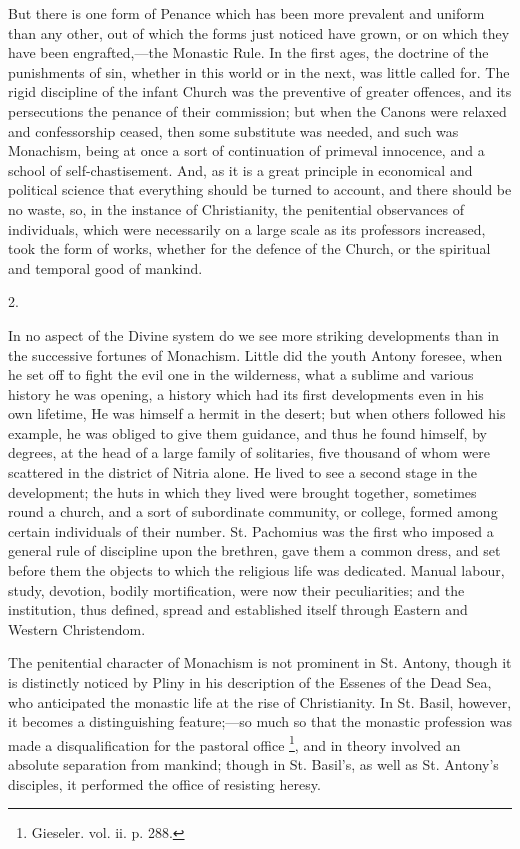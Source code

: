 
But there is one form of Penance which has been more prevalent and
uniform than any other, out of which the forms just noticed have
grown, or on which they have been engrafted,—the Monastic Rule. In
the first ages, the doctrine of the punishments of sin, whether in
this world or in the next, was little called for. The rigid discipline
of the infant Church was the preventive of greater offences, and its
persecutions the penance of their commission; but when the Canons were
relaxed and confessorship ceased, then some substitute was needed, and
such was Monachism, being at once a sort of continuation of primeval
innocence, and a school of self-chastisement. And, as it is a great
principle in economical and political science that everything should
be turned to account, and there should be no waste, so, in the
instance of Christianity, the penitential observances of individuals,
which were necessarily on a large scale as its professors increased,
took the form of works, whether for the defence of the Church, or the
spiritual and temporal good of mankind.

2.

In no aspect of the Divine system do we see more striking
developments than in the successive fortunes of Monachism. Little did
the youth Antony foresee, when he set off to fight the evil one in the
wilderness, what a sublime and various history he was opening, a
history which had its first developments even in his own lifetime, He
was himself a hermit in the desert; but when others followed his
example, he was obliged to give them guidance, and thus he found
himself, by degrees, at the head of a large family of solitaries, five
thousand of whom were scattered in the district of Nitria alone. He
lived to see a second stage in the development; the huts in which they
lived were brought together, sometimes round a church, and a sort of
subordinate community, or college, formed among certain individuals of
their number. St. Pachomius was the first who imposed a general rule
of discipline upon the brethren, gave them a common dress, and set
before them the objects to which the religious life was dedicated.
Manual labour, study, devotion, bodily mortification, were now their
peculiarities; and the institution, thus defined, spread and
established itself through Eastern and Western Christendom.

The penitential character of Monachism is not prominent in St.
Antony, though it is distinctly noticed by Pliny in his description of
the Essenes of the Dead Sea, who anticipated the monastic life at the
rise of Christianity. In St. Basil, however, it becomes a
distinguishing feature;—so much so that the monastic profession was
made a disqualification for the pastoral office \footnote{Gieseler. vol. ii. p. 288.}, and in
theory involved an absolute separation from mankind; though in St.
Basil's, as well as St. Antony's disciples, it performed the office of
resisting heresy.

